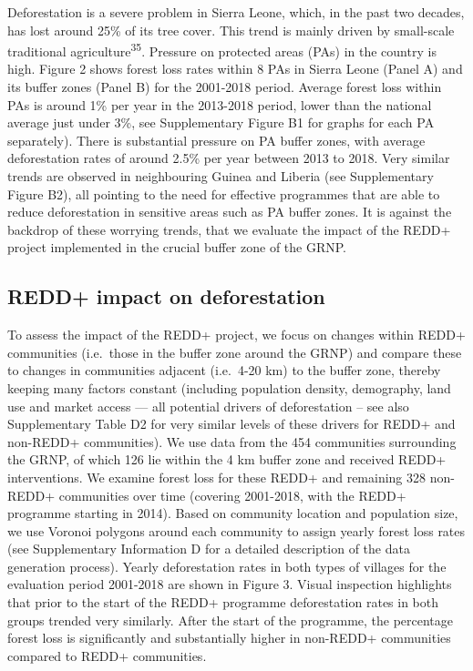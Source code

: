 \documentclass[
]{article}
\begin{document}
Deforestation is a severe problem in Sierra Leone, which, in the past
two decades, has lost around 25\% of its tree cover. This trend is
mainly driven by small-scale traditional
agriculture\textsuperscript{35}. Pressure on protected areas (PAs) in
the country is high. Figure 2 shows forest loss rates within 8 PAs in
Sierra Leone (Panel A) and its buffer zones (Panel B) for the 2001-2018
period. Average forest loss within PAs is around 1\% per year in the
2013-2018 period, lower than the national average just under 3\%, see
Supplementary Figure B1 for graphs for each PA separately). There is
substantial pressure on PA buffer zones, with average deforestation
rates of around 2.5\% per year between 2013 to 2018. Very similar trends
are observed in neighbouring Guinea and Liberia (see Supplementary
Figure B2), all pointing to the need for effective programmes that are
able to reduce deforestation in sensitive areas such as PA buffer zones.
It is against the backdrop of these worrying trends, that we evaluate
the impact of the REDD+ project implemented in the crucial buffer zone
of the GRNP.

\hypertarget{redd-impact-on-deforestation}{%
\subsection{REDD+ impact on
deforestation}\label{redd-impact-on-deforestation}}

To assess the impact of the REDD+ project, we focus on changes within
REDD+ communities (i.e.~those in the buffer zone around the GRNP) and
compare these to changes in communities adjacent (i.e.~4-20 km) to the
buffer zone, thereby keeping many factors constant (including population
density, demography, land use and market access --- all potential
drivers of deforestation -- see also Supplementary Table D2 for very
similar levels of these drivers for REDD+ and non-REDD+ communities). We
use data from the 454 communities surrounding the GRNP, of which 126 lie
within the 4 km buffer zone and received REDD+ interventions. We examine
forest loss for these REDD+ and remaining 328 non-REDD+ communities over
time (covering 2001-2018, with the REDD+ programme starting in 2014).
Based on community location and population size, we use Voronoi polygons
around each community to assign yearly forest loss rates (see
Supplementary Information D for a detailed description of the data
generation process). Yearly deforestation rates in both types of
villages for the evaluation period 2001-2018 are shown in Figure 3.
Visual inspection highlights that prior to the start of the REDD+
programme deforestation rates in both groups trended very similarly.
After the start of the programme, the percentage forest loss is
significantly and substantially higher in non-REDD+ communities compared
to REDD+ communities.
\end{document}
